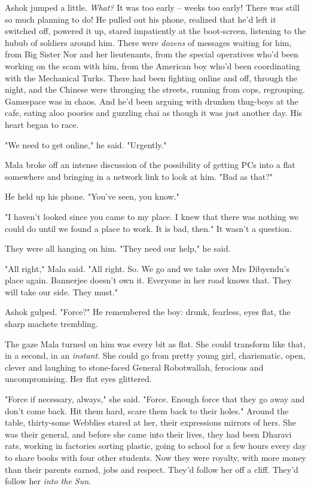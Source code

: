 Ashok jumped a little. \emph{What?} It was too early -- weeks too
early! There was still so much planning to do! He pulled out his
phone, realized that he'd left it switched off, powered it up,
stared impatiently at the boot-screen, listening to the hubub of
soldiers around him. There were \emph{dozens} of messages waiting
for him, from Big Sister Nor and her lieutenants, from the special
operatives who'd been working on the scam with him, from the
American boy who'd been coordinating with the Mechanical Turks.
There had been fighting online and off, through the night, and the
Chinese were thronging the streets, running from cops, regrouping.
Gamespace was in chaos. And he'd been arguing with drunken
thug-boys at the cafe, eating aloo poories and guzzling chai as
though it was just another day. His heart began to race.

"We need to get online," he said. "Urgently."

Mala broke off an intense discussion of the possibility of getting
PCs into a flat somewhere and bringing in a network link to look at
him. "Bad as that?"

He held up his phone. "You've seen, you know."

"I haven't looked since you came to my place. I knew that there was
nothing we could do until we found a place to work. It is bad,
then." It wasn't a question.

They were all hanging on him. "They need our help," he said.

"All right," Mala said. "All right. So. We go and we take over Mrs
Dibyendu's place again. Bannerjee doesn't own it. Everyone in her
road knows that. They will take our side. They must."

Ashok gulped. "Force?" He remembered the boy: drunk, fearless, eyes
flat, the sharp machete trembling.

The gaze Mala turned on him was every bit as flat. She could
transform like that, in a second, in an \emph{instant}. She could
go from pretty young girl, charismatic, open, clever and laughing
to stone-faced General Robotwallah, ferocious and uncompromising.
Her flat eyes glittered.

"Force if necessary, always," she said. "Force. Enough force that
they go away and don't come back. Hit them hard, scare them back to
their holes." Around the table, thirty-some Webblies stared at her,
their expressions mirrors of hers. She was their general, and
before she came into their lives, they had been Dharavi rats,
working in factories sorting plastic, going to school for a few
hours every day to share books with four other students. Now they
were royalty, with more money than their parents earned, jobs and
respect. They'd follow her off a cliff. They'd follow her
\emph{into the Sun}.

